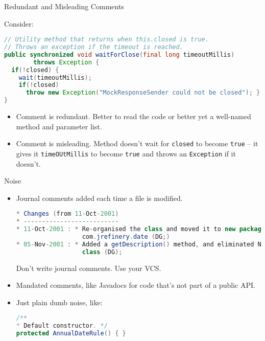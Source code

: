 \documentclass{beamer}
\begin{document}
\begin{frame}[fragile]{Redundant and Misleading Comments}


Consider:
\begin{lstlisting}[language=Java]
// Utility method that returns when this.closed is true. 
// Throws an exception if the timeout is reached.
public synchronized void waitForClose(final long timeoutMillis)
        throws Exception {
  if(!closed) {
    wait(timeoutMillis);
    if(!closed)
      throw new Exception("MockResponseSender could not be closed"); }
}
\end{lstlisting}

\begin{itemize}
\item Comment is redundant.  Better to read the code or better yet a well-named method and parameter list.
\item Comment is misleading.  Method doesn't wait for {\tt closed} to become {\tt true} -- it gives it {\tt timeOUtMillis} to become {\tt true} and throws an {\tt Exception} if it doesn't.
\end{itemize}


\end{frame}

\begin{frame}[fragile]{Noise}

\begin{itemize}
\item Journal comments added each time a file is modified.
\begin{lstlisting}[language=Java]
* Changes (from 11-Oct-2001)
* --------------------------
* 11-Oct-2001 : * Re-organised the class and moved it to new package 
                  com.jrefinery.date (DG;)
* 05-Nov-2001 : * Added a getDescription() method, and eliminated NotableDate 
                  class (DG);
\end{lstlisting}
Don't write journal comments.  Use your VCS.
\item Mandated comments, like Javadocs for code that's not part of a public API.
\item Just plain dumb noise, like:
\begin{lstlisting}[language=Java]
/**
* Default constructor. */
protected AnnualDateRule() { }
\end{lstlisting}

\end{itemize}

\end{frame}
\end{document}
